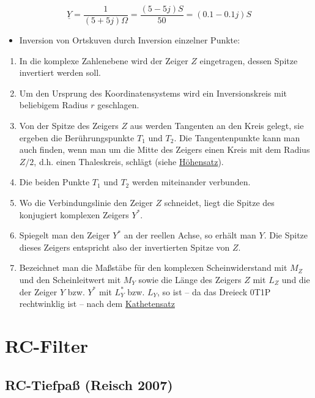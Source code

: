 \documentclass[
  ngerman,
  letterpaper,
]{scrbook}
\providecommand{\tightlist}{%
  \setlength{\itemsep}{0pt}\setlength{\parskip}{0pt}}
\begin{document}
\[
\underline{Y} = \frac{1}{(5 + 5j) \Omega} = \frac{(5 - 5j)S}{50} = (0.1 - 0.1j) S
\]

\begin{itemize}
\tightlist
\item
  Inversion von Ortskuven durch Inversion einzelner Punkte:
\end{itemize}

\begin{enumerate}
\def\labelenumi{\arabic{enumi}.}
\item
  In die komplexe Zahlenebene wird der Zeiger \(Z\) eingetragen, dessen
  Spitze invertiert werden soll.
\item
  Um den Ursprung des Koordinatensystems wird ein Inversionskreis mit
  beliebigem Radius \(r\) geschlagen.
\item
  Von der Spitze des Zeigers \(Z\) aus werden Tangenten an den Kreis
  gelegt, sie ergeben die Berührungspunkte \(T_1\) und \(T_2\). Die
  Tangentenpunkte kann man auch finden, wenn man um die Mitte des
  Zeigers einen Kreis mit dem Radius \(Z / 2\), d.h. einen Thaleskreis,
  schlägt (siehe
  \href{https://de.wikipedia.org/wiki/Höhensatz}{Höhensatz}).
\item
  Die beiden Punkte \(T_1\) und \(T_2\) werden miteinander verbunden.
\item
  Wo die Verbindungslinie den Zeiger \(Z\) schneidet, liegt die Spitze
  des konjugiert komplexen Zeigers \(Y^*\).
\item
  Spiegelt man den Zeiger \(Y^*\) an der reellen Achse, so erhält man
  \(Y\). Die Spitze dieses Zeigers entspricht also der invertierten
  Spitze von \(Z\).
\item
  Bezeichnet man die Maßstäbe für den komplexen Scheinwiderstand mit
  \(M_Z\) und den Scheinleitwert mit \(M_Y\) sowie die Länge des Zeigers
  \(Z\) mit \(L_Z\) und die der Zeiger \(Y\) bzw. \(Y^*\) mit \(L_Y^*\)
  bzw. \(L_Y\), so ist -- da das Dreieck 0T1P rechtwinklig ist -- nach
  dem
  \href{https://de.wikipedia.org/wiki/Satzgruppe_des_Pythagoras\#Kathetensatz_des_Euklid}{Kathetensatz}
\end{enumerate}

\section{RC-Filter}\label{rc-filter}

\subsection{RC-Tiefpaß (Reisch 2007)}\label{rc-tiefpauxdf-reisch2007}
\end{document}

